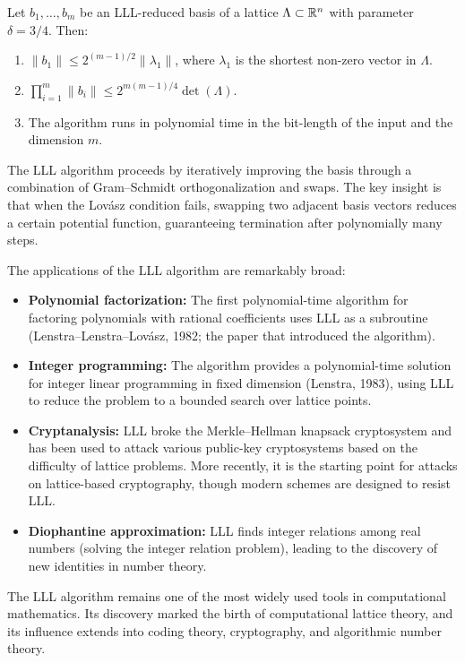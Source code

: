 \begin{theorem}
Let \(b_1, \dots, b_m\) be an LLL-reduced basis of a lattice \(\Lambda \subset \mathbb{R}^n\) with parameter \(\delta = 3/4\). Then:
\begin{enumerate}
  \item \(\|b_1\| \leq 2^{(m-1)/2} \|\lambda_1\|\), where \(\lambda_1\) is the shortest non-zero vector in \(\Lambda\).
  \item \(\prod_{i=1}^m \|b_i\| \leq 2^{m(m-1)/4} \det(\Lambda)\).
  \item The algorithm runs in polynomial time in the bit-length of the input and the dimension \(m\).
\end{enumerate}
\end{theorem}

The LLL algorithm proceeds by iteratively improving the basis through a combination of Gram--Schmidt orthogonalization and swaps. The key insight is that when the Lov\'{a}sz condition fails, swapping two adjacent basis vectors reduces a certain potential function, guaranteeing termination after polynomially many steps.

The applications of the LLL algorithm are remarkably broad:
\begin{itemize}
  \item \textbf{Polynomial factorization:} The first polynomial-time algorithm for factoring polynomials with rational coefficients uses LLL as a subroutine (Lenstra--Lenstra--Lov\'{a}sz, 1982; the paper that introduced the algorithm).
  \item \textbf{Integer programming:} The algorithm provides a polynomial-time solution for integer linear programming in fixed dimension (Lenstra, 1983), using LLL to reduce the problem to a bounded search over lattice points.
  \item \textbf{Cryptanalysis:} LLL broke the Merkle--Hellman knapsack cryptosystem and has been used to attack various public-key cryptosystems based on the difficulty of lattice problems. More recently, it is the starting point for attacks on lattice-based cryptography, though modern schemes are designed to resist LLL.
  \item \textbf{Diophantine approximation:} LLL finds integer relations among real numbers (solving the integer relation problem), leading to the discovery of new identities in number theory.
\end{itemize}

The LLL algorithm remains one of the most widely used tools in computational mathematics. Its discovery marked the birth of computational lattice theory, and its influence extends into coding theory, cryptography, and algorithmic number theory.

